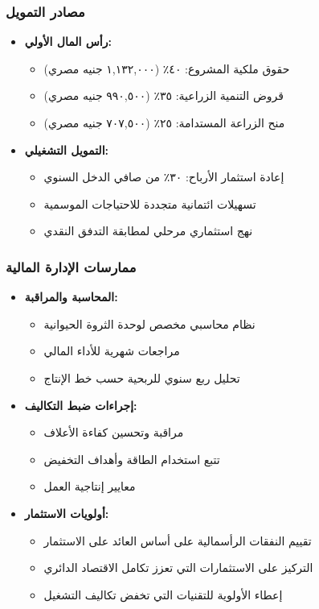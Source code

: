 \subsubsection{مصادر التمويل}
\begin{itemize}
    \item \textbf{رأس المال الأولي:}
    \begin{itemize}
        \item حقوق ملكية المشروع: ٤٠٪ (١,١٣٢,٠٠٠ جنيه مصري)
        \item قروض التنمية الزراعية: ٣٥٪ (٩٩٠,٥٠٠ جنيه مصري)
        \item منح الزراعة المستدامة: ٢٥٪ (٧٠٧,٥٠٠ جنيه مصري)
    \end{itemize}
    
    \item \textbf{التمويل التشغيلي:}
    \begin{itemize}
        \item إعادة استثمار الأرباح: ٣٠٪ من صافي الدخل السنوي
        \item تسهيلات ائتمانية متجددة للاحتياجات الموسمية
        \item نهج استثماري مرحلي لمطابقة التدفق النقدي
    \end{itemize}
\end{itemize}

\subsubsection{ممارسات الإدارة المالية}
\begin{itemize}
    \item \textbf{المحاسبة والمراقبة:}
    \begin{itemize}
        \item نظام محاسبي مخصص لوحدة الثروة الحيوانية
        \item مراجعات شهرية للأداء المالي
        \item تحليل ربع سنوي للربحية حسب خط الإنتاج
    \end{itemize}
    
    \item \textbf{إجراءات ضبط التكاليف:}
    \begin{itemize}
        \item مراقبة وتحسين كفاءة الأعلاف
        \item تتبع استخدام الطاقة وأهداف التخفيض
        \item معايير إنتاجية العمل
    \end{itemize}
    
    \item \textbf{أولويات الاستثمار:}
    \begin{itemize}
        \item تقييم النفقات الرأسمالية على أساس العائد على الاستثمار
        \item التركيز على الاستثمارات التي تعزز تكامل الاقتصاد الدائري
        \item إعطاء الأولوية للتقنيات التي تخفض تكاليف التشغيل
    \end{itemize}
\end{itemize}

